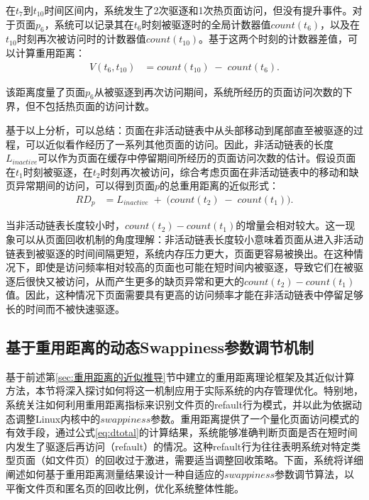 在$t_7$到$t_{10}$时间区间内，系统发生了2次驱逐和1次热页面访问，但没有提升事件。对于页面$p_6$，系统可以记录其在$t_6$时刻被驱逐时的全局计数器值$count(t_6)$，以及在$t_{10}$时刻再次被访问时的计数器值$count(t_{10})$。基于这两个时刻的计数器差值，可以计算重用距离：
\begin{align}
  \label{eq:refault_distance}
  V(t_6, t_{10})
  &= 
  count(t_{10})
  \;-\;
  count(t_6).
\end{align}

该距离度量了页面$p_6$从被驱逐到再次访问期间，系统所经历的页面访问次数的下界，但不包括热页面的访问计数。

基于以上分析，可以总结：页面在非活动链表中从头部移动到尾部直至被驱逐的过程，可以近似看作经历了一系列其他页面的访问。因此，非活动链表的长度$L_{inactive}$可以作为页面在缓存中停留期间所经历的页面访问次数的估计。假设页面在$t_1$时刻被驱逐，在$t_2$时刻再次被访问，综合考虑页面在非活动链表中的移动和缺页异常期间的访问，可以得到页面$p$的总重用距离的近似形式：
\begin{align}
  \label{eq:dtotal}
  RD_p
  &= 
  L_{inactive}
  \;+\;
  \bigl(count(t_2) \;-\; count(t_1)\bigr).
\end{align}

当非活动链表长度较小时，$count(t_2) - count(t_1)$的增量会相对较大。这一现象可以从页面回收机制的角度理解：非活动链表长度较小意味着页面从进入非活动链表到被驱逐的时间间隔更短，系统内存压力更大，页面更容易被换出。在这种情况下，即使是访问频率相对较高的页面也可能在短时间内被驱逐，导致它们在被驱逐后很快又被访问，从而产生更多的缺页异常和更大的$count(t_2) - count(t_1)$值。因此，这种情况下页面需要具有更高的访问频率才能在非活动链表中停留足够长的时间而不被快速驱逐。


\subsection{基于重用距离的动态Swappiness参数调节机制}

基于前述第\ref{sec:重用距离的近似推导}节中建立的重用距离理论框架及其近似计算方法，本节将深入探讨如何将这一机制应用于实际系统的内存管理优化。特别地，系统关注如何利用重用距离指标来识别文件页的refault行为模式，并以此为依据动态调整Linux内核中的\(swappiness\)参数。重用距离提供了一个量化页面访问模式的有效手段，通过公式\ref{eq:dtotal}的计算结果，系统能够准确判断页面是否在短时间内发生了驱逐后再访问（refault）的情况。这种refault行为往往表明系统对特定类型页面（如文件页）的回收过于激进，需要适当调整回收策略。下面，系统将详细阐述如何基于重用距离测量结果设计一种自适应的\(swappiness\)参数调节算法，以平衡文件页和匿名页的回收比例，优化系统整体性能。

